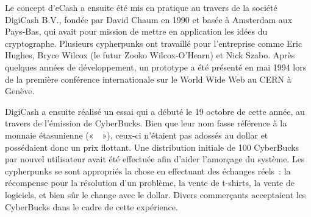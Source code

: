 Le concept d'eCash a ensuite été mis en pratique au travers de la société DigiCash B.V., fondée par David Chaum en 1990 et basée à Amsterdam aux Pays-Bas, qui avait pour mission de mettre en application les idées du cryptographe. Plusieurs cypherpunks ont travaillé pour l'entreprise comme Eric Hughes, Bryce Wilcox (le futur Zooko Wilcox-O'Hearn) et Nick Szabo. Après quelques années de développement, un prototype a été présenté en mai 1994 lors de la première conférence internationale sur le World Wide Web au CERN à Genève.

DigiCash a ensuite réalisé un essai qui a débuté le 19 octobre de cette année, au travers de l'émission de CyberBucks. Bien que leur nom fasse référence à la monnaie étasunienne («~~»), ceux-ci n'étaient pas adossés au dollar et possédaient donc un prix flottant. Une distribution initiale de 100 CyberBucks par nouvel utilisateur avait été effectuée afin d'aider l'amorçage du système. Les cypherpunks se sont appropriés la chose en effectuant des échanges réels~: la récompense pour la résolution d'un problème, la vente de t-shirts, la vente de logiciels, et bien sûr le change avec le dollar. Divers commerçants acceptaient les CyberBucks dans le cadre de cette expérience.

